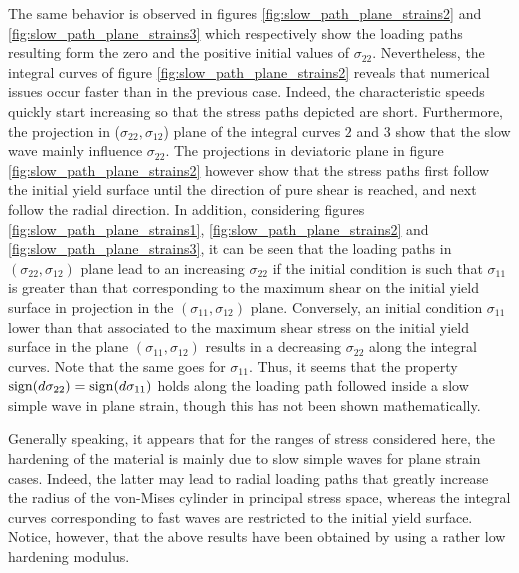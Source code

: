 The same behavior is observed in figures \ref{fig:slow_path_plane_strains2} and \ref{fig:slow_path_plane_strains3} which respectively show the loading paths resulting form the zero and the positive initial values of $\sigma_{22}$.
Nevertheless, the integral curves of figure \ref{fig:slow_path_plane_strains2} reveals that numerical issues occur faster than in the previous case.
Indeed, the characteristic speeds quickly start increasing so that the stress paths depicted are short.
Furthermore, the projection in ($\sigma_{22},\sigma_{12}$) plane of the integral curves $2$ and $3$ show that the slow wave mainly influence $\sigma_{22}$.
The projections in deviatoric plane in figure \ref{fig:slow_path_plane_strains2} however show that the stress paths first follow the initial yield surface until the direction of pure shear is reached, and next follow the radial direction.
In addition, considering figures \ref{fig:slow_path_plane_strains1}, \ref{fig:slow_path_plane_strains2} and \ref{fig:slow_path_plane_strains3}, it can be seen that the loading paths in $(\sigma_{22},\sigma_{12})$ plane lead to an increasing $\sigma_{22}$ if the initial condition is such that $\sigma_{11}$ is greater than that corresponding to the maximum shear on the initial yield surface in projection in the $(\sigma_{11},\sigma_{12})$ plane.
Conversely, an initial condition $\sigma_{11}$ lower than that associated to the maximum shear stress on the initial yield surface in the plane $(\sigma_{11},\sigma_{12})$ results in a decreasing $\sigma_{22}$ along the integral curves.
Note that the same goes for $\sigma_{11}$.
Thus, it seems that the property $\operatorname{sign}(d\sigma_{22})=\operatorname{sign}(d\sigma_{11})$ holds along the loading path followed inside a slow simple wave in plane strain, though this has not been shown mathematically.

Generally speaking, it appears that for the ranges of stress considered here, the hardening of the material is mainly due to slow simple waves for plane strain cases.
Indeed, the latter may lead to radial loading paths that greatly increase the radius of the von-Mises cylinder in principal stress space, whereas the integral curves corresponding to fast waves are restricted to the initial yield surface. Notice, however, that the above results have been obtained by using a rather low hardening modulus.

